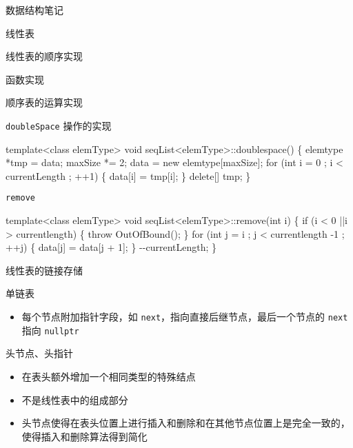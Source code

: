 \documentclass[
  ignorenonframetext,
]{beamer}
\newenvironment{Shaded}{}{}
\newcommand{\NormalTok}[1]{#1}
\providecommand{\tightlist}{%
  \setlength{\itemsep}{0pt}\setlength{\parskip}{0pt}}
\begin{document}
\begin{frame}[fragile]{数据结构笔记}
\begin{block}{线性表}
\begin{block}{线性表的顺序实现}
\begin{block}{函数实现}
\begin{block}{顺序表的运算实现}
\begin{block}{\texttt{doubleSpace} 操作的实现}
\begin{Shaded}
\begin{Highlighting}[]
\NormalTok{template\textless{}class elemType\textgreater{}}
\NormalTok{void seqList\textless{}elemType\textgreater{}::doublespace()}
\NormalTok{\{}
\NormalTok{  elemtype *tmp = data;}
\NormalTok{  maxSize *= 2;}
\NormalTok{  data = new elemtype[maxSize];}
\NormalTok{  for (int i = 0 ; i \textless{} currentLength ; ++1)}
\NormalTok{  \{}
\NormalTok{    data[i] = tmp[i];}
\NormalTok{  \}}
\NormalTok{  delete[] tmp;}
\NormalTok{\}}
\end{Highlighting}
\end{Shaded}
\end{block}

\begin{block}{\texttt{remove}}
\protect{}\label{remove}

\begin{Shaded}
\begin{Highlighting}[]
\NormalTok{template\textless{}class elemType\textgreater{}}
\NormalTok{void seqList\textless{}elemType\textgreater{}::remove(int i)}
\NormalTok{\{}
\NormalTok{  if (i \textless{} 0 ||i \textgreater{} currentlength)}
\NormalTok{  \{}
\NormalTok{    throw OutOfBound();}
\NormalTok{  \}}
\NormalTok{  for (int j = i ; j \textless{} currentlength {-}1 ; ++j)}
\NormalTok{  \{}
\NormalTok{    data[j] = data[j + 1];}
\NormalTok{  \}}
\NormalTok{  {-}{-}currentLength;}
\NormalTok{\}}
\end{Highlighting}
\end{Shaded}
\end{block}
\end{block}
\end{block}
\end{block}

\begin{block}{线性表的链接存储}
\protect{}\label{ux7ebfux6027ux8868ux7684ux94feux63a5ux5b58ux50a8}
\begin{block}{单链表}
\protect{}\label{ux5355ux94feux8868}
\begin{itemize}
\tightlist
\item
  每个节点附加指针字段，如
  \texttt{next}，指向直接后继节点，最后一个节点的 \texttt{next} 指向
  \texttt{nullptr}
\end{itemize}


\begin{block}{头节点、头指针}
\protect{}\label{ux5934ux8282ux70b9ux5934ux6307ux9488}
\begin{itemize}
\tightlist
\item
  在表头额外增加一个相同类型的特殊结点
\item
  不是线性表中的组成部分
\item
  头节点使得在表头位置上进行插入和删除和在其他节点位置上是完全一致的，使得插入和删除算法得到简化
\end{itemize}


\end{block}
\end{block}
\end{block}
\end{block}
\end{frame}
\end{document}
